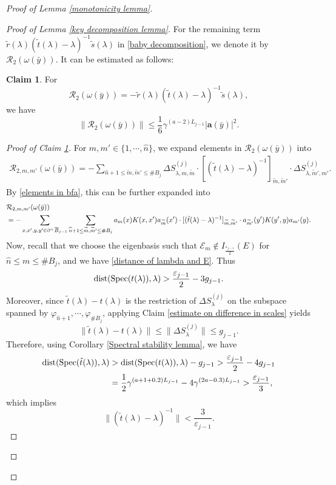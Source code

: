 \documentclass[11pt,reqno,UTF8,twoside]{amsart}
\newcommand{\spec}{{\rm Spec}}
\renewcommand{\tt}{\tilde{t}}
\newcommand{\tm}{\widetilde{m}}
\newcommand{\bfa}{\mathbf{a}}
\newcommand{\mcE}{\mathcal{E}}
\newcommand{\mcR}{\mathcal{R}}
\newcommand{\whn}{\widehat{n}}
\newcommand{\barB}{\overline{B}}
\newcommand{\diffSj}{\Delta {S}^{(j)}}
\newcommand{\dist}{{\rm dist}}
\theoremstyle{definition}
\newtheorem{claim}[thm]{\bf Claim}
\numberwithin{equation}{section}
\begin{document}
\begin{proof}[Proof of Lemma \ref{monotonicity lemma}]
\begin{proof}[Proof of Lemma \ref{key decomposition lemma}]
For the remaining term $\tilde{r}(\lambda)(\tilde{t}(\lambda)-\lambda)^{-1}\tilde{s}(\lambda)$ in \eqref{baby decomposition}, we denote it by $\mcR_2(\omega(\bar{y}))$. It can be estimated  as follows:
\begin{claim}\label{estimate on mcR2}
  For 
  \begin{equation}\label{mcR2}
    \mcR_2(\omega(\bar{y}))=-\tilde{r}(\lambda)(\tilde{t}(\lambda)-\lambda)^{-1}\tilde{s}(\lambda),
  \end{equation}
  we have 
  \[ \|\mcR_2(\omega(\bar{y})) \|\leq \frac{1}{6}\gamma^{(a-2)L_{j-1}} |\bfa(\bar{y})|^2 .\] 
\end{claim}
\begin{proof}[Proof of Claim \ref{estimate on mcR2}]
  For $m,m'\in \{1,\cdots,\whn\}$, we expand elements in $\mcR_2(\omega(\bar{y}))$ into 
  \begin{align*}
    \mcR_{2,m,m'}(\omega(\bar{y}))=-\sum_{ \whn+1\leq \tm,\tm'\leq  \# B_j } \diffSj_{\lambda,m,\tm}\cdot [(\tt(\lambda)-\lambda)^{-1}]_{\tm,\tm'}\cdot \diffSj_{\lambda,\tm',m'}.
  \end{align*}
  By \eqref{elements in bfa}, this can be further expanded into 
  \begin{align}\label{mcR2 expansion}
        &\mcR_{2,m,m'}(\omega(\bar{y}))\\
     \notag   &=-\sum_{x,x',y,y'\in \partial^+\barB_{j-1}} \sum_{ \whn+1\leq \tm,\tm'\leq  \# B_j } a_{m}(x)K(x,x') a_{\tm}(x')\cdot [(\tt(\lambda)-\lambda)^{-1}]_{\tm,\tm'}\cdot a_{\tm'}(y')K(y',y) a_{m'}(y).
  \end{align}
  Now, recall that we choose the eigenbasis such that $\mcE_m\notin I_{\frac{\varepsilon_{j-1}}{2}}(E)$ for $\whn\leq m\leq \# B_j$, and we have \eqref{distance of lambda and E}. Thus 
  \[\dist(\spec(t(\lambda)),\lambda)> \frac{\varepsilon_{j-1}}{2}-3g_{j-1}.\]
  Moreover, since $\tt(\lambda)-t(\lambda)$ is the restriction of $\diffSj_{\lambda}$ on the subspace spanned by ${\varphi_{\whn+1},\cdots,\varphi_{\#B_j}}$, applying Claim \ref{estimate on difference in scales} yields 
  \[\| \tt(\lambda)-t(\lambda) \| \leq \|\diffSj_{\lambda}\|\leq g_{j-1}.\]
  Therefore, using  Corollary \ref{Spectral stability lemma},  we have 
  \begin{align*}
      \dist(\spec(\tt(\lambda)),\lambda) & >\dist(\spec(t(\lambda)),\lambda)-g_{j-1}>\frac{\varepsilon_{j-1}}{2}-4g_{j-1} \\
        &=\frac{1}{2}\gamma^{(a+1+0.2)L_{j-1}}-4\gamma^{(2a-0.3)L_{j-1}} >\frac{\varepsilon_{j-1}}{3},
  \end{align*}
  which implies 
  \begin{equation}\label{resolvent of tilde t}
    \|(\tt(\lambda)-\lambda)^{-1}\|< \frac{3}{\varepsilon_{j-1}}.
  \end{equation}


\end{proof}
\end{proof}
\end{proof}
\end{document}
